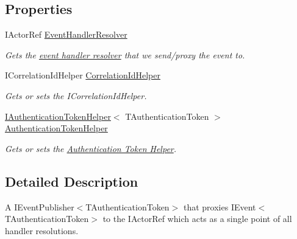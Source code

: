\subsection*{Properties}
\begin{DoxyCompactItemize}
\item 
I\+Actor\+Ref \hyperlink{classCqrs_1_1Akka_1_1Events_1_1AkkaEventBusProxy_abd36f5db7a03a38d573b11c0d6f37117_abd36f5db7a03a38d573b11c0d6f37117}{Event\+Handler\+Resolver}
\begin{DoxyCompactList}\small\item\em Gets the \hyperlink{}{event handler resolver} that we send/proxy the event to. \end{DoxyCompactList}\item 
I\+Correlation\+Id\+Helper \hyperlink{classCqrs_1_1Akka_1_1Events_1_1AkkaEventBusProxy_a4cc4ec0ece94393246b0c64f02d55f41_a4cc4ec0ece94393246b0c64f02d55f41}{Correlation\+Id\+Helper}
\begin{DoxyCompactList}\small\item\em Gets or sets the I\+Correlation\+Id\+Helper. \end{DoxyCompactList}\item 
\hyperlink{interfaceCqrs_1_1Authentication_1_1IAuthenticationTokenHelper}{I\+Authentication\+Token\+Helper}$<$ T\+Authentication\+Token $>$ \hyperlink{classCqrs_1_1Akka_1_1Events_1_1AkkaEventBusProxy_a54964db320ef21b0564e66e9f258f694_a54964db320ef21b0564e66e9f258f694}{Authentication\+Token\+Helper}
\begin{DoxyCompactList}\small\item\em Gets or sets the \hyperlink{}{Authentication Token Helper}. \end{DoxyCompactList}\end{DoxyCompactItemize}


\subsection{Detailed Description}
A I\+Event\+Publisher$<$\+T\+Authentication\+Token$>$ that proxies I\+Event$<$\+T\+Authentication\+Token$>$ to the I\+Actor\+Ref which acts as a single point of all handler resolutions. 



